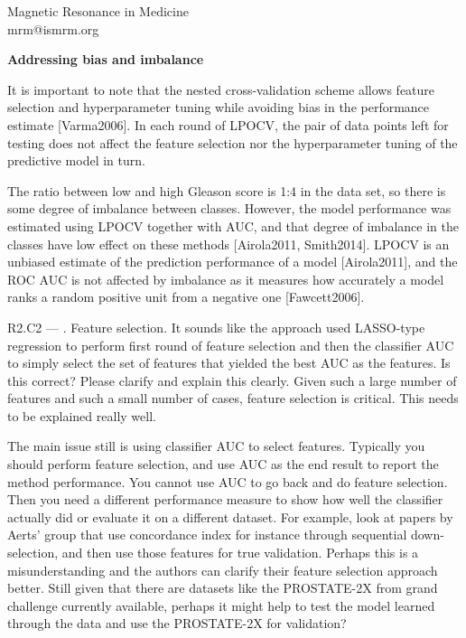 \documentclass{letter}
\newenvironment{comment}[1]%
  {\vspace{5ex}\par\textsf{#1 ---} \ignorespaces}%
  {\par\ignorespacesafterend}
\newenvironment{reply}%
  {\vspace{2ex}\par\bfseries}%
  {\par\upshape}
\providecommand{\citep}[1]{[#1]}
\begin{document}
\begin{letter}{Magnetic Resonance in Medicine \\ mrm@ismrm.org}
\begin{reply}
Addressing bias and imbalance

It is important to note that the nested cross-validation scheme allows feature
selection and hyperparameter tuning while avoiding bias in the performance
estimate \citep{Varma2006}. In each round of LPOCV, the pair of data points left
for testing does not affect the feature selection nor the hyperparameter tuning
of the predictive model in turn.

The ratio between low and high Gleason score is 1:4 in the data set, so there is
some degree of imbalance between classes. However, the model performance was
estimated using LPOCV together with AUC, and that degree of imbalance in the
classes have low effect on these methods \citep{Airola2011, Smith2014}. LPOCV is
an unbiased estimate of the prediction performance of a model
\citep{Airola2011}, and the ROC AUC is not affected by imbalance as it measures
how accurately a model ranks a random positive unit from a negative one
\citep{Fawcett2006}.
\end{reply}


\begin{comment}{R2.C2}
2. Feature selection. It sounds like the approach used LASSO-type regression to
perform first round of feature selection and then the classifier AUC to simply
select the set of features that yielded the best AUC as the features. Is this
correct? Please clarify and explain this clearly. Given such a large number of
features and such a small number of cases, feature selection is critical. This
needs to be explained really well.

The main issue still is using classifier AUC to select features. Typically you
should perform feature selection, and use AUC as the end result to report the
method performance. You cannot use AUC to go back and do feature selection. Then
you need a different performance measure to show how well the classifier
actually did or evaluate it on a different dataset. For example, look at papers
by Aerts' group that use concordance index for instance through sequential
down-selection, and then use those features for true validation. Perhaps this is
a misunderstanding and the authors can clarify their feature selection approach
better. Still given that there are datasets like the PROSTATE-2X from grand
challenge currently available, perhaps it might help to test the model learned
through the data and use the PROSTATE-2X for validation?
\end{comment}


\end{letter}
\end{document}
